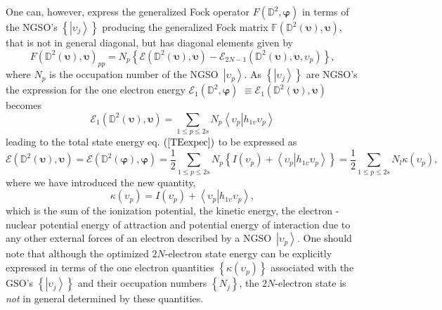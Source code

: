 \documentclass[aps,preprint]{revtex4}%
\begin{document}
One can, however, express the generalized Fock operator $F\left(
\mathbb{D}^{2},\bm{\varphi}\right)  $ in terms of the NGSO's $\left\{
\left\vert \upsilon_{j}\right\rangle \right\}  $ producing the generalized
Fock matrix $\mathbb{F}\left(  \mathbb{D}^{2}\left(  \bm{\upsilon}\right)
,\bm{\upsilon}\right)  ,$ that is not in general diagonal, but has diagonal
elements given by
\begin{equation}
F\left(  \mathbb{D}^{2}\left(  \bm{\upsilon}\right)  ,\bm{\upsilon }\right)
_{pp}=N_{p}\left\{  \mathcal{E}\left(  \mathbb{D}^{2}\left(
\bm{\upsilon}\right)  ,\bm{\upsilon}\right)  -\mathcal{E}_{2N-1}\left(
\mathbb{D}^{2}\left(  \bm{\upsilon}\right)  ,\bm{\upsilon,}\upsilon
_{p}\right)  \right\}  ,
\end{equation}
where $N_{p}$ is the occupation number of the NGSO\ $\left\vert \upsilon
_{p}\right\rangle $. As $\left\{  \left\vert \upsilon_{j}\right\rangle
\right\}  $ are NGSO's the expression for the one electron energy
$\mathcal{E}_{1}\left(  \mathbb{D}^{2},\bm{\varphi}\right)  $ $\equiv
\mathcal{E}_{1}\left(  \mathbb{D}^{2}\left(  \bm{\upsilon}\right)
,\bm{\upsilon}\right)  $ becomes%
\begin{equation}
\mathcal{E}_{1}\left(  \mathbb{D}^{2}\left(  \bm{\upsilon}\right)
,\bm{\upsilon}\right)  =\sum_{1\leq p\leq2s}N_{p}\left\langle \left.
\upsilon_{p}\right\vert h_{1\upsilon}\upsilon_{p}\right\rangle
\end{equation}
leading to the total state energy eq. $\left(  \ref{TEexpec}\right)  $ to be
expressed as
\begin{equation}
\mathcal{E}\left(  \mathbb{D}^{2}\left(  \bm{\upsilon}\right)
,\bm{\upsilon}\right)  =\mathcal{E}\left(  \mathbb{D}^{2}\left(
\bm{\varphi}\right)  ,\bm{\varphi}\right)  =\frac{1}{2}\sum_{1\leq p\leq
2s}N_{p}\left\{  I\left(  \upsilon_{p}\right)  +\left\langle \left.
\upsilon_{p}\right\vert h_{1\upsilon}\upsilon_{p}\right\rangle \right\}
=\frac{1}{2}%
{\textstyle\sum\limits_{1\leq p\leq2s}}
N_{l}\kappa\left(  \upsilon_{p}\right)  ,
\end{equation}
where we have introduced the new quantity,
\begin{equation}
\kappa\left(  \upsilon_{p}\right)  =I\left(  \upsilon_{p}\right)
+\left\langle \left.  \upsilon_{p}\right\vert h_{1\upsilon}\upsilon
_{p}\right\rangle ,
\end{equation}
which is the sum of the ionization potential, the kinetic energy, the electron
- nuclear potential energy of attraction and potential energy of interaction
due to any other external forces of an electron described by a
NGSO\ $\left\vert \upsilon_{p}\right\rangle $. One should note that although
the optimized $2N$-electron state energy can be explicitly expressed in terms
of the one electron quantities $\left\{  \kappa\left(  \upsilon_{p}\right)
\right\}  $ associated with the GSO's $\left\{  \left\vert \upsilon
_{j}\right\rangle \right\}  $ and their occupation numbers $\left\{
N_{j}\right\}  $, the $2N$-electron state is \emph{not }in general determined
by these quantities.
\end{document}
